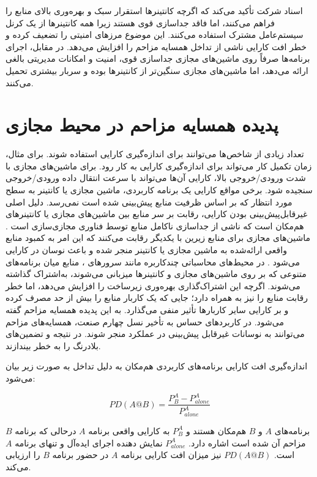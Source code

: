 اسناد شرکت  تأکید می‌کند\cite{vmware_whitepaper} که اگرچه کانتینرها استقرار سبک و بهره‌وری بالای منابع را فراهم می‌کنند، اما فاقد جداسازی قوی هستند زیرا همه کانتینرها از یک کرنل سیستم‌عامل مشترک استفاده می‌کنند. این موضوع مرزهای امنیتی را تضعیف کرده و خطر افت کارایی ناشی از تداخل همسایه‌ مزاحم را افزایش می‌دهد. در مقابل، اجرای برنامه‌ها صرفاً روی ماشین‌های مجازی جداسازی قوی، امنیت و امکانات مدیریتی بالغی ارائه می‌دهد، اما ماشین‌های مجازی سنگین‌تر از کانتینرها بوده و سربار بیشتری تحمیل می‌کنند.

\section{پدیده همسایه مزاحم در محیط مجازی}

تعداد زیادی از شاخص‌ها می‌توانند برای اندازه‌گیری کارایی استفاده شوند. برای مثال، زمان تکمیل کار می‌تواند برای اندازه‌گیری کارایی به کار رود. برای ماشین‌های مجازی با شدت ورودی/خروجی بالا، کارایی آن‌ها می‌تواند با سرعت انتقال داده ورودی/خروجی سنجیده شود. برخی مواقع کارایی یک برنامه کاربردی، ماشین مجازی یا کانتینر به سطح مورد انتظار که بر اساس ظرفیت منابع پیش‌بینی شده است نمی‌رسد. دلیل اصلی غیرقابل‌پیش‌بینی بودن کارایی، رقابت بر سر منابع بین ماشین‌های مجازی یا کانتینرهای هم‌مکان است که ناشی از جداسازی ناکامل منابع توسط فناوری مجازی‌سازی است \cite{armbrust2009clouds}. ماشین‌های مجازی برای منابع زیرین با یکدیگر رقابت می‌کنند که این امر به کمبود منابع واقعی ارائه‌شده به ماشین مجازی یا کانتینر منجر شده و باعث نوسان در کارایی می‌شود \cite{koh2007interference}. در محیط‌های محاسباتی چندکاربره مانند سرورهای ، منابع میان برنامه‌های متنوعی که بر روی ماشین‌های مجازی و کانتینرها میزبانی می‌شوند، به‌اشتراک گذاشته می‌شوند. اگرچه این اشتراک‌گذاری بهره‌وری زیرساخت را افزایش می‌دهد، اما خطر رقابت منابع را نیز به همراه دارد؛ جایی که یک کاربار منابع را بیش از حد مصرف کرده و بر کارایی سایر کاربارها تأثیر منفی می‌گذارد. به این پدیده همسایه مزاحم گفته می‌شود. در کاربردهای حساس به تأخیر نسل چهارم صنعت، همسایه‌های مزاحم می‌توانند به نوسانات غیرقابل پیش‌بینی در عملکرد منجر شوند. در نتیجه  و تضمین‌های بلادرنگ را به خطر بیندازند.

اندازه‌گیری افت کارایی برنامه‌های کاربردی هم‌مکان به دلیل تداخل به صورت زیر بیان می‌شود\cite{lin2023vminterference}:

\begin{equation} \label{rel_perf}
    PD(A@B) = \frac{P^A_B - P^A_{alone}}{P^A_{alone}}
\end{equation}

برنامه‌های $A$ و $B$ هم‌مکان هستند و $P^A_B$ به کارایی واقعی برنامه $A$ درحالی که برنامه $B$ مزاحم آن شده است اشاره دارد. $P^A_{alone}$ نمایش دهنده اجرای ایده‌آل و تنهای برنامه $A$ است. $PD(A@B)$ نیز میزان افت کارایی برنامه $A$ در حضور برنامه $B$ را ارزیابی می‌کند.

